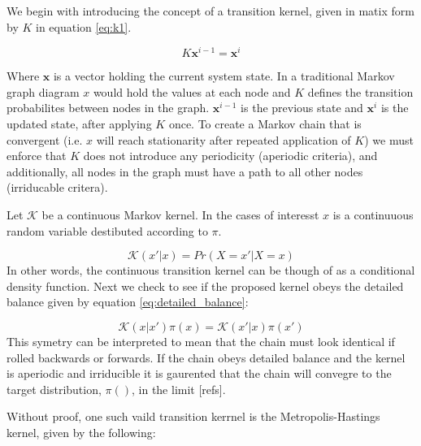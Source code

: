 \documentclass[10pt,a4paper]{report}
\begin{document}
We begin with introducing the concept of a transition kernel, given in matix form by $K$ in equation \ref{eq:k1}. 

\begin{equation}
K \mathbf x^{i-1} = \mathbf x^{i}
\label{eq:k1}
\end{equation}

Where $\mathbf x$ is a vector holding the current system state.  In a traditional Markov graph diagram $x$ would hold the values at each node and $K$ defines the transition probabilites between nodes in the graph.  $\mathbf x^{i-1}$ is the previous state and $\mathbf x^{i}$ is the updated state, after applying $K$ once.  To create a Markov chain that is convergent (i.e. $x$ will reach stationarity after repeated application of $K$) we must enforce that $K$ does not introduce any periodicity (aperiodic criteria), and additionally, all nodes in the graph must have a path to all other nodes (irriducable critera).

Let $\mathcal{K} $ be a continuous Markov kernel.  In the cases of interesst $x$ is a continuuous random variable destibuted according to $\pi$.

\begin{equation}
\mathcal K(x' | x) = Pr(X = x' |X=x)
\end{equation}
In other words, the continuous transition kernel can be though of as a conditional density function.
Next we check to see if the proposed kernel obeys the detailed balance given by equation \ref{eq:detailed_balance}:

\begin{equation}
\mathcal K(x| x') \pi(x) = \mathcal K(x'| x) \pi(x')
\label{eq:detailed_balance}
\end{equation}
This symetry can be interpreted to mean that the chain must look identical if rolled backwards or forwards. 
If the chain obeys detailed balance and the kernel is aperiodic and irriducible it is gaurented that the chain will convegre to the target distribution, $\pi()$, in the limit [refs].

Without proof, one such vaild transition kerrnel is the Metropolis-Hastings kernel, given by the following:
\end{document}
